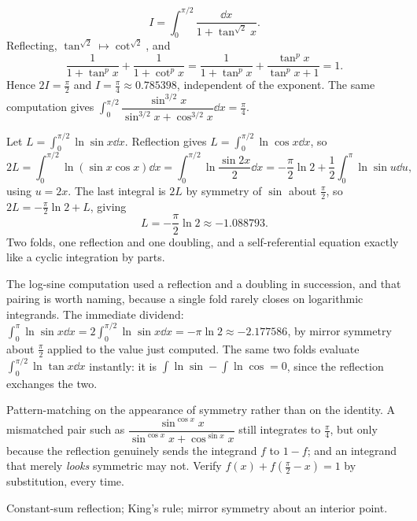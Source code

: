 \begin{worked}
\[I=\int_0^{\pi/2}\frac{\dd x}{1+\tan^{\sqrt2}x}.\]
Reflecting, $\tan^{\sqrt2}\mapsto\cot^{\sqrt2}$, and
\[\frac{1}{1+\tan^{p}x}+\frac{1}{1+\cot^{p}x}=\frac{1}{1+\tan^{p}x}+\frac{\tan^{p}x}{\tan^{p}x+1}=1.\]
Hence $2I=\tfrac{\pi}{2}$ and $I=\tfrac{\pi}{4}\approx0.785398$, independent of the exponent. The same computation gives $\int_0^{\pi/2}\dfrac{\sin^{3/2}x}{\sin^{3/2}x+\cos^{3/2}x}\dd x=\tfrac{\pi}{4}$.
\end{worked}

\begin{worked}
Let $L=\int_0^{\pi/2}\ln\sin x\dd x$. Reflection gives $L=\int_0^{\pi/2}\ln\cos x\dd x$, so
\[2L=\int_0^{\pi/2}\ln(\sin x\cos x)\dd x=\int_0^{\pi/2}\ln\frac{\sin2x}{2}\dd x=-\frac{\pi}{2}\ln2+\frac12\int_0^{\pi}\ln\sin u\dd u,\]
using $u=2x$. The last integral is $2L$ by symmetry of $\sin$ about $\tfrac{\pi}{2}$, so $2L=-\tfrac{\pi}{2}\ln2+L$, giving
\[L=-\frac{\pi}{2}\ln2\approx-1.088793.\]
Two folds, one reflection and one doubling, and a self-referential equation exactly like a cyclic integration by parts.
\end{worked}

\begin{keynote}
The log-sine computation used a reflection and a doubling in succession, and that pairing is worth naming, because a single fold rarely closes on logarithmic integrands. The immediate dividend: $\int_0^{\pi}\ln\sin x\dd x=2\int_0^{\pi/2}\ln\sin x\dd x=-\pi\ln2\approx-2.177586$, by mirror symmetry about $\tfrac{\pi}{2}$ applied to the value just computed. The same two folds evaluate $\int_0^{\pi/2}\ln\tan x\dd x$ instantly: it is $\int\ln\sin-\int\ln\cos=0$, since the reflection exchanges the two.
\end{keynote}

\begin{trap}
Pattern-matching on the appearance of symmetry rather than on the identity. A mismatched pair such as $\dfrac{\sin^{\cos x}x}{\sin^{\cos x}x+\cos^{\sin x}x}$ still integrates to $\tfrac{\pi}{4}$, but only because the reflection genuinely sends the integrand $f$ to $1-f$; and an integrand that merely \emph{looks} symmetric may not. Verify $f(x)+f(\tfrac{\pi}{2}-x)=1$ by substitution, every time.
\end{trap}

\begin{seealsob}Constant-sum reflection; King's rule; mirror symmetry about an interior point.\end{seealsob}

